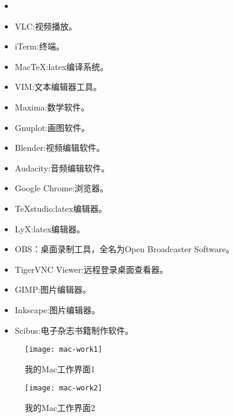 \documentclass[11pt,fleqn]{book} %
\begin{document}
\begin{recommendation}[我的软件列表]
  \begin{itemize}
    \item 
    \item VLC:视频播放。
    \item iTerm:终端。
    \item Mac\TeX :latex编译系统。
    \item VIM:文本编辑器工具。
    \item Maxima:数学软件。
    \item Gnuplot:画图软件。
    \item Blender:视频编辑软件。
    \item Audacity:音频编辑软件。
    \item Google Chrome:浏览器。
    \item \TeX studio:latex编辑器。
    \item LyX:latex编辑器。
    \item OBS：桌面录制工具，全名为Open Broadcaster Software。
    \item TigerVNC Viewer:远程登录桌面查看器。
    \item GIMP:图片编辑器。
    \item Inkscape:图片编辑器。
    \item Scibus:电子杂志书籍制作软件。
  \end{itemize}
\end{recommendation}

\begin{figure}[h]
  \hspace{-0.6cm}\texttt{[image: mac-work1]}
  \caption{我的Mac工作界面1}
\end{figure}
\begin{figure}[h]
  \hspace{-0.6cm}\texttt{[image: mac-work2]}
  \caption{我的Mac工作界面2}
\end{figure}


\end{document}
